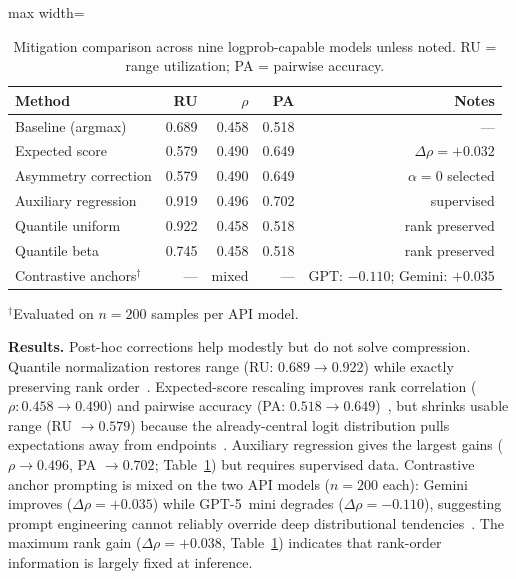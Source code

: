 \documentclass[11pt]{article}
\begin{document}
\begin{table}[htbp]
\centering
\caption{Mitigation comparison across nine logprob-capable models unless
noted. RU = range utilization; PA = pairwise accuracy.}
\label{tab:mitcompare}
\small
\begin{adjustbox}{max width=\columnwidth}
\begin{tabular}{@{}lrrrr@{}}
\toprule
\textbf{Method} & \textbf{RU} & $\rho$ & \textbf{PA} & \textbf{Notes} \\
\midrule
Baseline (argmax)       & 0.689 & 0.458 & 0.518 & --- \\
Expected score          & 0.579 & 0.490 & 0.649 & $\Delta\rho=+0.032$ \\
Asymmetry correction    & 0.579 & 0.490 & 0.649 & $\alpha=0$ selected \\
Auxiliary regression    & 0.919 & 0.496 & 0.702 & supervised \\
Quantile uniform        & 0.922 & 0.458 & 0.518 & rank preserved \\
Quantile beta           & 0.745 & 0.458 & 0.518 & rank preserved \\
Contrastive anchors$^\dagger$ & --- & mixed & --- & GPT: $-0.110$; Gemini: $+0.035$ \\
\bottomrule
\end{tabular}
\end{adjustbox}
\vspace{0.3em}
\footnotesize{$^\dagger$Evaluated on $n=200$ samples per API model.}
\end{table}

\textbf{Results.} Post-hoc corrections help modestly but do not solve
compression. Quantile normalization restores range (RU: $0.689\to0.922$)
while exactly preserving rank order~\citep{bolstad2003comparison}.
Expected-score rescaling improves rank correlation ($\rho:0.458\to0.490$)
and pairwise accuracy (PA: $0.518\to0.649$)~\citep{liu2023geval}, but
shrinks usable range (RU $\to0.579$) because the already-central logit
distribution pulls expectations away from endpoints~\citep{rafailov2023direct}.
Auxiliary regression gives the largest gains ($\rho\to0.496$, PA
$\to0.702$; Table~\ref{tab:mitcompare}) but requires supervised data.
Contrastive anchor prompting is mixed on the two API models ($n=200$
each): Gemini improves ($\Delta\rho=+0.035$) while GPT-5~mini degrades
($\Delta\rho=-0.110$), suggesting prompt engineering cannot reliably
override deep distributional tendencies~\citep{rafailov2023direct}. The
maximum rank gain ($\Delta\rho=+0.038$, Table~\ref{tab:mitcompare})
indicates that rank-order information is largely fixed at inference.
\end{document}
